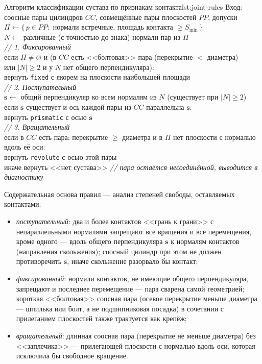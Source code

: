 \begin{pseudocode}{Алгоритм классификации сустава по признакам контакта}{lst:joint-rules}
 Вход: соосные пары цилиндров $CC$, совмещённые пары плоскостей $PP$,
       допуски\\
 $\Pi \leftarrow \{\,p \in PP :$ нормали встречные, площадь контакта
       $\ge S_{\min}\,\}$\\
 $N \leftarrow$ различные (с точностью до знака) нормали пар из $\Pi$\\
 \textit{// 1. Фиксированный}\\
 если $\Pi \neq \varnothing$ и (в $CC$ есть <<болтовая>> пара
       (перекрытие $<$ диаметра)\\
 или $|N| \ge 2$ и у $N$ нет общего перпендикуляра):\\
 вернуть \texttt{fixed} с якорем на плоскости наибольшей площади\\
 \textit{// 2. Поступательный}\\
 $\mathbf{s} \leftarrow$ общий перпендикуляр ко всем нормалям из $N$
       (существует при $|N| \ge 2$)\\
 если $\mathbf{s}$ существует и ось каждой пары из $CC$ параллельна
       $\mathbf{s}$:\\
 вернуть \texttt{prismatic} с осью $\mathbf{s}$\\
 \textit{// 3. Вращательный}\\
 если в $CC$ есть пара: перекрытие $\ge$ диаметра и в $\Pi$ нет
       плоскости с нормалью вдоль её оси:\\
 вернуть \texttt{revolute} с осью этой пары\\
 иначе вернуть <<нет сустава>> \quad\textit{// пара остаётся
       несоединённой, выводится в диагностику}
\end{pseudocode}

Содержательная основа правил --- анализ степеней свободы, оставляемых
контактами:
\begin{itemize}
  \item \emph{поступательный}: два и более контактов <<грань к грани>> с
        непараллельными нормалями запрещают все вращения и все перемещения,
        кроме одного --- вдоль общего перпендикуляра $\mathbf{s}$ к нормалям
        контактов (направления скольжения); соосный цилиндр при этом не должен
        противоречить $\mathbf{s}$, иначе скольжение разорвало бы контакт;
  \item \emph{фиксированный}: нормали контактов, не имеющие общего
        перпендикуляра, запрещают и последнее перемещение --- пара сварена
        самой геометрией; короткая <<болтовая>> соосная пара (осевое перекрытие
        меньше диаметра --- шпилька или болт, а не подшипниковая посадка) в
        сочетании с прилеганием плоскостей также трактуется как крепёж;
  \item \emph{вращательный}: длинная соосная пара (перекрытие не меньше
        диаметра) без <<заплечика>> --- прилегающей плоскости с нормалью вдоль
        оси, которая исключила бы свободное вращение.
\end{itemize}

